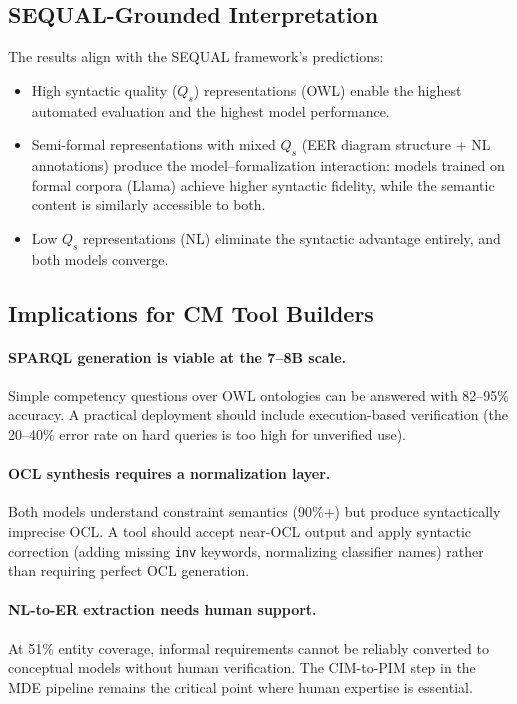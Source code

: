 \documentclass[runningheads]{llncs}
\begin{document}
\subsection{SEQUAL-Grounded Interpretation}

The results align with the SEQUAL framework's predictions:
\begin{itemize}[noitemsep]
  \item High syntactic quality ($Q_s$) representations (OWL) enable the highest automated evaluation and the highest model performance.
  \item Semi-formal representations with mixed $Q_s$ (EER diagram structure + NL annotations) produce the model--formalization interaction: models trained on formal corpora (Llama) achieve higher syntactic fidelity, while the semantic content is similarly accessible to both.
  \item Low $Q_s$ representations (NL) eliminate the syntactic advantage entirely, and both models converge.
\end{itemize}

\subsection{Implications for CM Tool Builders}

\paragraph{SPARQL generation is viable at the 7--8B scale.} Simple competency questions over OWL ontologies can be answered with 82--95\% accuracy. A practical deployment should include execution-based verification (the 20--40\% error rate on hard queries is too high for unverified use).

\paragraph{OCL synthesis requires a normalization layer.} Both models understand constraint semantics (90\%+) but produce syntactically imprecise OCL. A tool should accept near-OCL output and apply syntactic correction (adding missing \texttt{inv} keywords, normalizing classifier names) rather than requiring perfect OCL generation.

\paragraph{NL-to-ER extraction needs human support.} At 51\% entity coverage, informal requirements cannot be reliably converted to conceptual models without human verification. The CIM-to-PIM step in the MDE pipeline remains the critical point where human expertise is essential.
\end{document}

